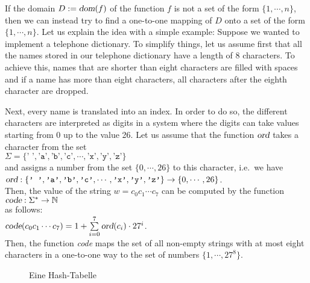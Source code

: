 If the domain $D := \textsl{dom}(f)$ of the function $f$ is not a set of the form $\{1, \cdots, n\}$, 
then we can instead try to find a one-to-one mapping of $D$ onto a set of the form $\{1,\cdots,n\}$.
Let us explain the idea with a simple example:  Suppose we wanted to implement a telephone
dictionary.
To simplify things, let us assume first that all the names stored in our telephone dictionary
have a length of 8 characters.  To achieve this, names that are shorter than eight characters
are filled with spaces and if a name has more than eight characters, all characters after the
eighth character are dropped.

Next, every name is translated into an index.  In order to do so, the different
characters are interpreted as digits in a system where the digits can take values starting
from 0 up to the value 26.
Let us assume that the function  $\textsl{ord}$ takes a character from the set
\\[0.2cm]
\hspace*{1.3cm}
$\Sigma = \{ \texttt{' '}, \texttt{'a'}, \texttt{'b'}, \texttt{'c'}, \cdots, \texttt{'x'}, \texttt{'y'}, \texttt{'z'} \}$ 
\\[0.2cm]
and assigns a number from the set $\{0,\cdots,26\}$ to this character, i.e.~we have \\[0.2cm]
\hspace*{1.3cm} 
$\textsl{ord}: \{ \texttt{' '}, \texttt{'a'}, \texttt{'b'}, \texttt{'c'}, \cdots, \texttt{'x'}, \texttt{'y'}, \texttt{'z'} \} \rightarrow \{0,\cdots, 26\}$.
\\[0.2cm]
Then, the value of the string  $w = c_0c_1\cdots c_7$ can be computed by the function \\[0.2cm]
\hspace*{1.3cm} 
$\textsl{code}: \Sigma^* \rightarrow \mathbb{N}$ \\[0.2cm]
as follows: \\[0.2cm]
\hspace*{1.3cm} 
$\textsl{code}(c_0c_1\cdots c_7) = 1 + \sum\limits_{i=0}^7 \textsl{ord}(c_i) \cdot 27^i$.
\\[0.2cm]
Then, the function \textsl{code} maps the set of all non-empty strings with at most eight characters in a
one-to-one way to the set of numbers $\{1,\cdots,27^8\}$.


\begin{figure}[!ht]
  \centering
  \caption{Eine Hash-Tabelle}
  \label{fig:hash-example}
\end{figure}

